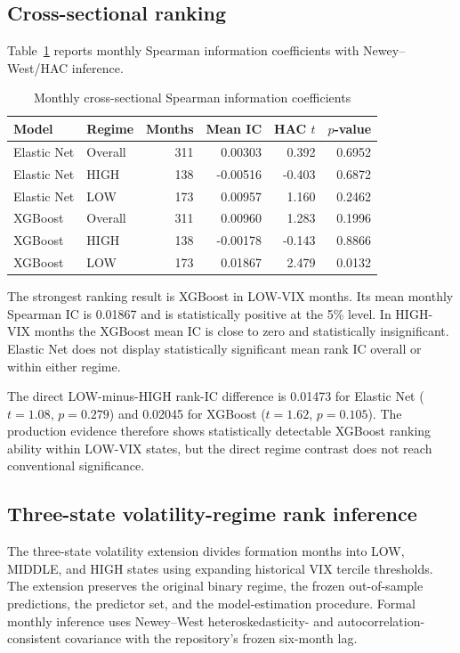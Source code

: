 \subsection{Cross-sectional ranking}

Table~\ref{tab:rank-ic} reports monthly Spearman information coefficients with Newey--West/HAC inference.

\begin{table}[htbp]
\centering
\caption{Monthly cross-sectional Spearman information coefficients}
\label{tab:rank-ic}
\begin{tabular}{llrrrr}
\hline
Model & Regime & Months & Mean IC & HAC $t$ & $p$-value \\
\hline
Elastic Net & Overall & 311 &  0.00303 &  0.392 & 0.6952 \\
Elastic Net & HIGH    & 138 & -0.00516 & -0.403 & 0.6872 \\
Elastic Net & LOW     & 173 &  0.00957 &  1.160 & 0.2462 \\
XGBoost     & Overall & 311 &  0.00960 &  1.283 & 0.1996 \\
XGBoost     & HIGH    & 138 & -0.00178 & -0.143 & 0.8866 \\
XGBoost     & LOW     & 173 &  0.01867 &  2.479 & 0.0132 \\
\hline
\end{tabular}
\end{table}

The strongest ranking result is XGBoost in LOW-VIX months. Its mean monthly Spearman IC is 0.01867 and is statistically positive at the 5\% level. In HIGH-VIX months the XGBoost mean IC is close to zero and statistically insignificant. Elastic Net does not display statistically significant mean rank IC overall or within either regime.

The direct LOW-minus-HIGH rank-IC difference is 0.01473 for Elastic Net ($t=1.08$, $p=0.279$) and 0.02045 for XGBoost ($t=1.62$, $p=0.105$). The production evidence therefore shows statistically detectable XGBoost ranking ability within LOW-VIX states, but the direct regime contrast does not reach conventional significance.

\subsection{Three-state volatility-regime rank inference}

The three-state volatility extension divides formation months into LOW, MIDDLE, and HIGH states using expanding historical VIX tercile thresholds. The extension preserves the original binary regime, the frozen out-of-sample predictions, the predictor set, and the model-estimation procedure. Formal monthly inference uses Newey--West heteroskedasticity- and autocorrelation-consistent covariance with the repository's frozen six-month lag.

